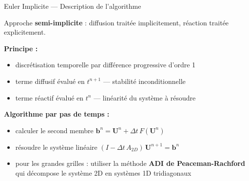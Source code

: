 \documentclass[10pt]{beamer}
\begin{document}
\begin{frame}{Euler Implicite — Description de l'algorithme}

Approche \textbf{semi-implicite} : diffusion traitée implicitement,
réaction traitée explicitement.

\bigskip

\textbf{Principe :}
\begin{itemize}
  \item discrétisation temporelle par différence progressive d'ordre 1
  \item terme diffusif évalué en $t^{n+1}$ — stabilité inconditionnelle
  \item terme réactif évalué en $t^n$ — linéarité du système à résoudre
\end{itemize}

\bigskip

\textbf{Algorithme par pas de temps :}
\begin{itemize}
  \item calculer le second membre $\mathbf{b}^n = \mathbf{U}^n + \Delta t\,F(\mathbf{U}^n)$
  \item résoudre le système linéaire $(I - \Delta t\,A_{2D})\,\mathbf{U}^{n+1} = \mathbf{b}^n$
  \item pour les grandes grilles : utiliser la méthode \textbf{ADI de Peaceman-Rachford}
        qui décompose le système 2D en systèmes 1D tridiagonaux
\end{itemize}

\end{frame}
\end{document}
